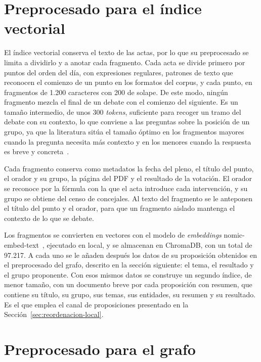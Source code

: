 \documentclass[11pt, a4paper]{report}
\begin{document}
	\section{Preprocesado para el índice vectorial}
	\label{sec:prep-vectorial}

	El índice vectorial conserva el texto de las actas, por lo que su preprocesado
	se limita a dividirlo y a anotar cada fragmento. Cada acta se divide primero
	por puntos del orden del día, con expresiones regulares, patrones
	de texto que reconocen el comienzo de un punto en los formatos del corpus, y cada punto, en fragmentos
	de 1.200 caracteres con 200 de solape. De este modo, ningún fragmento mezcla
	el final de un debate con el comienzo del siguiente. Es un tamaño intermedio, de unos
	300 \textit{tokens}, suficiente para recoger un tramo del debate con su contexto, lo
	que conviene a las preguntas sobre la posición de un grupo, ya que la literatura
	sitúa el tamaño óptimo en los fragmentos mayores cuando la pregunta necesita más
	contexto y en los menores cuando la respuesta es breve y
	concreta~\cite{bhat2025-chunk-size}.

	Cada fragmento conserva como metadatos la fecha del pleno, el título del
	punto, el orador y su grupo, la página del PDF y el resultado de la votación.
	El orador se reconoce por la fórmula con la que el acta introduce cada
	intervención, y su grupo se obtiene del censo de concejales. Al texto del
	fragmento se le anteponen el título del punto y el orador, para que un
	fragmento aislado mantenga el contexto de lo que se debate.

	Los fragmentos se convierten en vectores con el modelo de \textit{embeddings}
	nomic-embed-text~\cite{nomic-embed-text}, ejecutado en local, y se almacenan en ChromaDB, con un total
	de 97.217. A cada uno se le añaden después los datos de su proposición obtenidos en el preprocesado del grafo, descrito en
	la sección siguiente: el tema, el resultado y el grupo proponente. Con esos mismos datos se construye un segundo índice, de menor
	tamaño, con un documento breve por cada proposición con resumen, que contiene su título, su
	grupo, sus temas, sus entidades, su resumen y su resultado. Es el que emplea
	el canal de proposiciones presentado en la
	Sección~\ref{sec:reordenacion-local}.

	\section{Preprocesado para el grafo}
	\label{sec:prep-grafo}
\end{document}
